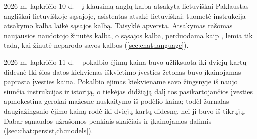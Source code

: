 \begin{lessonbox}{2026 m. lapkričio 10 d. -- į klausimą anglų kalba atsakyta lietuviškai}
Paklaustas angliškai lietuviškoje sąsajoje, asistentas atsakė lietuviškai: tuometė instrukcija
atsakymo kalba laikė sąsajos kalbą. Taisyklė apversta. Atsakymas rašomas naujausios naudotojo
žinutės kalba, o sąsajos kalba, perduodama kaip , lemia tik tada, kai
žinutė neparodo savos kalbos (\cref{sec:chat:language}).
\end{lessonbox}

\begin{lessonbox}{2026 m. lapkričio 11 d. -- pokalbio ėjimų kaina buvo užfiksuota iki dviejų kartų didesnė}
Iki šios datos kiekvienas iškvietimo įvesties žetonas buvo įkainojamas paprasta įvesties kaina.
Pokalbio ėjimas kiekviename savo žingsnyje iš naujo siunčia instrukcijas ir istoriją, o tiekėjas
didžiąją dalį tos pasikartojančios įvesties apmokestina gerokai mažesne nuskaitymo iš podėlio
kaina; todėl žurnalas daugiažingsnio ėjimo kainą rodė iki dviejų kartų didesnę, nei ji buvo
iš tikrųjų. Dabar sąnaudos užrašomos penkiais skaičiais ir įkainojamos dalimis
(\cref{sec:chat:persist,ch:models}).
\end{lessonbox}
